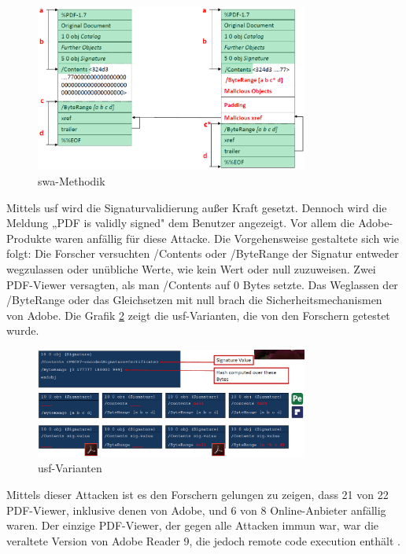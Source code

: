 \begin{figure}[!htbp]
	\centering
	\includegraphics[width=0.8\textwidth]{"images/sig_wrap_attack.png"}
	\caption{\gls{swa}-Methodik \cite{ccc-break-pdf-slides}}
	\label{fig:swa}
\end{figure}

Mittels \gls{usf} wird die Signaturvalidierung außer Kraft gesetzt. Dennoch wird die Meldung „PDF is validly signed" dem Benutzer angezeigt. Vor allem die Adobe-Produkte waren anfällig für diese Attacke. Die Vorgehensweise gestaltete sich wie folgt: Die Forscher versuchten /Contents oder /ByteRange der Signatur entweder wegzulassen oder unübliche Werte, wie kein Wert oder null zuzuweisen. Zwei PDF-Viewer versagten, als man /Contents auf 0 Bytes setzte. Das Weglassen der /ByteRange oder das Gleichsetzen mit null brach die Sicherheitsmechanismen von Adobe. Die Grafik \ref{fig:usf} zeigt die \gls{usf}-Varianten, die von den Forschern getestet wurde.

\begin{figure}[!htbp]
	\centering
	\includegraphics[width=0.8\textwidth]{"images/univ_sig_forgery.png"}
	\caption{\gls{usf}-Varianten \cite{ccc-break-pdf-slides}}
	\label{fig:usf}
\end{figure}

Mittels dieser Attacken ist es den Forschern gelungen zu zeigen, dass 21 von 22 PDF-Viewer, inklusive denen von Adobe, und 6 von 8 Online-Anbieter anfällig waren. Der einzige PDF-Viewer, der gegen alle Attacken immun war, war die veraltete Version von Adobe Reader 9, die jedoch remote code execution enthält \cite{ccc-break-pdf}. 